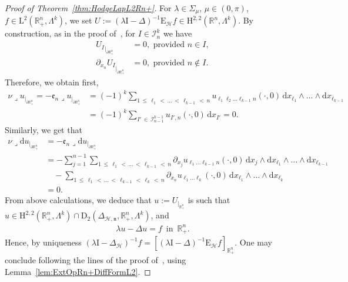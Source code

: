 \documentclass[AHL,Unicode,longabstracts,published]{cedram}
\newcommand{\bbR}{\mathbb{R}}
\newcommand{\rmH}{\mathrm{H}}%
\newcommand{\rmd}{\mathrm{d}}
\newcommand{\rmD}{\mathrm{D}}
\newcommand{\rmL}{\mathrm{L}}
\newcommand{\rmE}{\mathrm{E}}
\newcommand{\rmI}{\mathrm{I}}
\newcommand{\clH}{\mathcal{H}}
\newcommand{\clI}{\mathcal{I}}
\newcommand{\fkn}{\mathfrak{n}}
\newcommand{\fke}{\mathfrak{e}}
\newcommand{\iprod}{\mathbin{\lrcorner}}
\begin{document}
\begin{proof}[{Proof of Theorem~\ref{thm:HodgeLapL2Rn+}}]
For $\lambda\in\Sigma_{\mu}$, $\mu\in(0,\pi)$, $f\in\rmL^2(\bbR^n_+,\Lambda^k)$, we set $U:=(\lambda \rmI -\Delta)^{-1}\rmE _{\clH}f\in \rmH^{2,2}(\bbR^n,\Lambda^k)$. By construction, as in the proof of~\cite[Proposition~5.1]{Gaudin2022}, for $I\in\clI^k_n$ we have
\begin{align*}
{U_I}_{|_{\partial\bbR^n_+}} &= 0, \text{ provided } n\in I,\\
{\partial_{x_n}U_I}_{|_{\partial\bbR^n_+}} &= 0, \text{ provided } n\notin I.
\end{align*}
Therefore, we obtain first,
\begin{align*}
\nu\iprod u_{|_{\partial\bbR^n_+}}=-\fke _n\iprod u_{|_{\partial\bbR^n_+}} &= (-1)^k\sum_{1\,\leqslant\,\ell_1\,<\,\ldots\,<\,\ell_{k-1}\,<\,n} u_{\ell_1 \ell_2\ldots \ell_{k-1} n}(\cdot,0)\, \rmd x_{\ell_1}\wedge\ldots\wedge\rmd x_{\ell_{k-1}}\\
&= (-1)^k\sum_{I'\,\in\,\clI^{k-1}_{n-1}} u_{I', n}(\cdot,0)\,\rmd x_{I'} = 0.
\end{align*}
Similarly, we get that
\begin{align*}
\nu\iprod \rmd u_{|_{\partial\bbR^n_+}}&=-\fke _n\iprod \rmd u_{|_{\partial\bbR^n_+}}\\
&= -\sum_{j=1}^{n-1}\sum_{1\,\leqslant \,\ell_1\,<\,\ldots\,<\,\ell_{k-1}\,<\,n} \partial_{x_j}u_{\ell_1 \ldots \ell_{k-1} n}(\cdot,0)\, \rmd x_{j}\wedge\rmd x_{\ell_1}\wedge\ldots\wedge\rmd x_{\ell_{k-1}}\\
&\quad -\sum_{1\,\leqslant\, \ell_1\,<\,\ldots\,<\,\ell_{k-1}\,<\,\ell_{k}\,<\,n} \partial_{x_n}u_{\ell_1 \ldots \ell_{k} }(\cdot,0)\,\rmd x_{\ell_1}\wedge\ldots\wedge\rmd x_{\ell_{k}}\\
&= 0.
\end{align*}
From above calculations, we deduce that $u:=U_{|_{\bbR^n_+}}$ is such that $u\in\rmH^{2,2}(\bbR^n_+,\Lambda^k)\cap\rmD_2(\Delta_{\clH,\fkn},\bbR^n_+,\Lambda^k)$, and
\begin{align*}
\lambda u -\Delta u = f \,\text{ in }\, \bbR^n_+ .
\end{align*}
Hence, by uniqueness $(\lambda \rmI -\Delta_{\clH})^{-1}f=[(\lambda \rmI -\Delta)^{-1}\rmE _{\clH}f]_{\bbR^n_+}$. One may conclude following the lines of the proof of~\cite[Proposition~5.1]{Gaudin2022}, using Lemma~\ref{lem:ExtOpRn+DiffFormL2}.
\end{proof}
\end{document}
